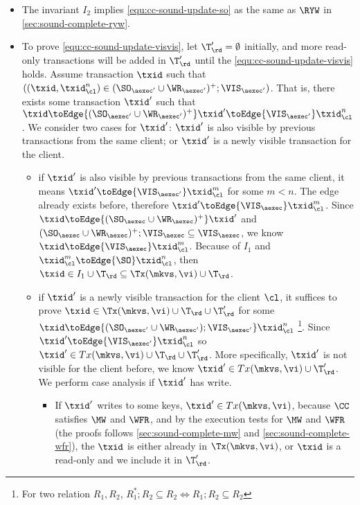 \begin{itemize}
\item The invariant \( I_2 \) implies \cref{equ:cc-sound-update-so} as the same as \( \RYW \) in \cref{sec:sound-complete-ryw}.
\item To prove \cref{equ:cc-sound-update-visvis}, let \( \T'_\rd = \emptyset \) initially,
and more read-only transactions will be added in \( \T'_\rd \) until the \cref{equ:cc-sound-update-visvis} holds.
Assume transaction \( \txid \) such that \( ((\txid, \txid_\cl^n) \in ( \SO_{\aexec'} \cup \WR_{\aexec'} )^{+} ; \VIS_{\aexec'}) \).
That is, there exists some transaction \( \txid' \) such that
\( \txid \toEdge{( \SO_{\aexec'} \cup \WR_{\aexec'} )^+}  \txid' \toEdge{\VIS_{\aexec'}} \txid_\cl^n\).
We consider two cases for \( \txid' \): \( \txid' \) is also visible by previous transactions from the same client; 
or \( \txid' \) is a newly visible transaction for the client.
\begin{itemize}
    \item if \( \txid' \) is also visible by previous transactions from the same client, it means \( \txid' \toEdge{\VIS_{\aexec'}} \txid_\cl^m \) for some \( m < n \).
    The edge already exists before, therefore \( \txid' \toEdge{\VIS_\aexec} \txid_\cl^m \).
    Since \( \txid \toEdge{( \SO_{\aexec} \cup \WR_{\aexec} )^{+}} \txid' \) and \( ( \SO_{\aexec} \cup \WR_{\aexec} )^{+} ; \VIS_{\aexec} \subseteq \VIS_{\aexec} \),
    we know \( \txid \toEdge{ \VIS_{\aexec} }  \txid_\cl^m  \).
    Because of \( I_1 \) and \( \txid_\cl^m \toEdge{\SO} \txid_\cl^n \), then \( \txid \in I_1 \cup \T_\rd \subseteq \Tx(\mkvs, \vi) \cup \T_\rd \).
    
    \item if \( \txid' \) is a newly visible transaction for the client \( \cl \),
    it suffices to prove \(\txid \in \Tx(\mkvs, \vi) \cup \T_\rd \cup \T'_\rd \) 
    for some \( \txid \toEdge{ ( \SO_{\aexec'} \cup \WR_{\aexec'} ) ; \VIS_{\aexec'} } \txid_\cl^n  \)%
    \footnote{For two relation \( R_1, R_2\), \( R_1^* ; R_2 \subseteq R_2 \iff R_1 ; R_2 \subseteq R_2 \) }.
    Since \( \txid' \toEdge{\VIS_{\aexec'}} \txid_\cl^n \) so \( \txid' \in Tx(\mkvs, \vi) \cup \T_\rd \cup \T'_\rd\).
    More specifically, \( \txid' \) is not visible for the client before, we know \( \txid' \in Tx(\mkvs, \vi) \cup \T'_\rd\).
    We perform case analysis if \( \txid' \) has write.
    \begin{itemize}

        \item If \( \txid' \) writes to some keys, \ie \( \txid' \in Tx(\mkvs, \vi) \), 
        because  \( \CC \) satisfies \( \MW \) and \( \WFR \),
        and by the execution tests for \( \MW \) and \( \WFR \) (the proofs follows \cref{sec:sound-complete-mw} and \cref{sec:sound-complete-wfr}),
        the \( \txid \) is either already in \( \Tx(\mkvs, \vi) \), 
        or \( \txid \) is a read-only and we include it in \( \T'_\rd \).


\end{itemize}
\end{itemize}
\end{itemize}
